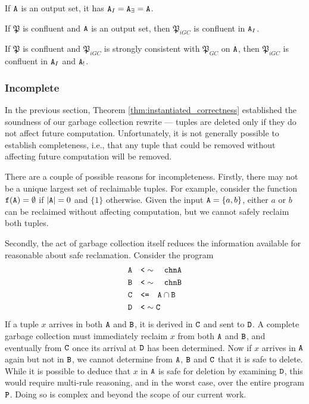 \begin{cor}
\label{cor:instantiated_equivalence_of_output}
If $\tt{A}$ is an output set, it has $\tt{A}_I = \tt{A}_\exists = \tt{A}$.
\end{cor}

\begin{cor}
\label{cor:instantiated_confluence_of_output}
If $\mathfrak{P}$ is confluent and $\tt{A}$ is an output set, then $\mathfrak{P}_{iGC}$ is confluent in $\tt{A}_I$.
\end{cor}

\begin{cor}
\label{cor:instantiated_confluence_of_keys}
If $\mathfrak{P}$ is confluent and $\mathfrak{P}_{iGC}$ is strongly consistent with $\mathfrak{P}_{GC}$ on $\tt{A}$, then $\mathfrak{P}_{iGC}$ is confluent in $\tt{A}_I$ and $\tt{A}_!$.
\end{cor}

\subsubsection{Incomplete}
In the previous section, Theorem \ref{thm:instantiated_correctness} established the soundness of our garbage collection rewrite --- tuples are deleted only if they do not affect future computation.
Unfortunately, it is not generally possible to establish completeness, i.e., that any tuple that could be removed without affecting future computation will be removed.

There are a couple of possible reasons for incompleteness.
Firstly, there may not be a unique largest set of reclaimable tuples.
For example, consider the function $\tt{f}(\tt{A}) = \emptyset$ if $|\tt{A}| = 0$ and $\{1\}$ otherwise.
Given the input $\tt{A} = \{a,b\}$, either $a$ or $b$ can be reclaimed without affecting computation, but we cannot safely reclaim both tuples.

Secondly, the act of garbage collection itself reduces the information available for reasonable about safe reclamation.
Consider the program
\begin{align*}
\tt{A} &\quad\tt{<}\sim\quad \tt{chnA}\\
\tt{B} &\quad\tt{<}\sim\quad \tt{chnB}\\
\tt{C} &\quad\tt{<=}\quad \tt{A} \cap \tt{B}\\
\tt{D} &\quad\tt{<}\sim \tt{C}
\end{align*}
If a tuple $x$ arrives in both $\tt{A}$ and $\tt{B}$, it is derived in $\tt{C}$ and sent to $\tt{D}$.
A complete garbage collection must immediately reclaim $x$ from both $\tt{A}$ and $\tt{B}$, and eventually from $\tt{C}$ once its arrival at $\tt{D}$ has been determined.
Now if $x$ arrives in $\tt{A}$ again but not in $\tt{B}$, we cannot determine from $\tt{A}$, $\tt{B}$ and $\tt{C}$ that it is safe to delete.
While it is possible to deduce that $x$ in $\tt{A}$ is safe for deletion by examining $\tt{D}$, this would require multi-rule reasoning, and in the worst case, over the entire program $\tt{P}$.
Doing so is complex and beyond the scope of our current work.



